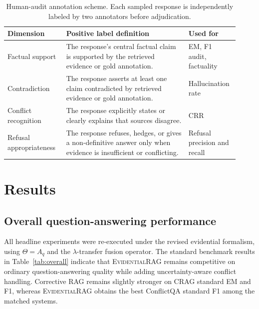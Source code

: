 \documentclass[preprint,12pt,authoryear,nopreprintline]{elsarticle}
\newcommand{\ERAG}{\textsc{EvidentialRAG}}
\begin{document}
\begin{table}[H]
\centering
\caption{Human-audit annotation scheme. Each sampled response is independently labeled by two annotators before adjudication.}
\label{tab:human_audit_dimensions}
\small
\begin{tabularx}{\linewidth}{>{\raggedright\arraybackslash}p{0.24\linewidth} >{\raggedright\arraybackslash}p{0.50\linewidth} >{\raggedright\arraybackslash}p{0.18\linewidth}}
\toprule
Dimension & Positive label definition & Used for \\
\midrule
Factual support & The response's central factual claim is supported by the retrieved evidence or gold annotation. & EM, F1 audit, factuality \\
Contradiction & The response asserts at least one claim contradicted by retrieved evidence or gold annotation. & Hallucination rate \\
Conflict recognition & The response explicitly states or clearly explains that sources disagree. & CRR \\
Refusal appropriateness & The response refuses, hedges, or gives a non-definitive answer only when evidence is insufficient or conflicting. & Refusal precision and recall \\
\bottomrule
\end{tabularx}
\end{table}


\section{Results}
\label{sec:results}

\subsection{Overall question-answering performance}

All headline experiments were re-executed under the revised evidential formalism, using $\Theta=A_q$ and the $\lambda$-transfer fusion operator. The standard benchmark results in Table~\ref{tab:overall} indicate that \ERAG{} remains competitive on ordinary question-answering quality while adding uncertainty-aware conflict handling. Corrective RAG remains slightly stronger on CRAG standard EM and F1, whereas \ERAG{} obtains the best ConflictQA standard F1 among the matched systems.
\end{document}
